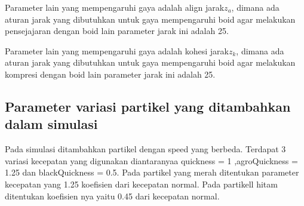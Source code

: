 Parameter lain yang mempengaruhi gaya adalah align jarak$z_a$, dimana ada aturan jarak yang dibutuhkan untuk gaya mempengaruhi boid agar melakukan pensejajaran dengan boid lain parameter jarak ini adalah 25.

Parameter lain yang mempengaruhi gaya adalah kohesi jarak$z_k$, dimana ada aturan jarak yang dibutuhkan untuk gaya mempengaruhi boid agar melakukan kompresi dengan boid lain parameter jarak ini adalah 25.
\subsection{Parameter variasi partikel yang ditambahkan dalam simulasi}
Pada simulasi ditambahkan partikel dengan speed yang berbeda. Terdapat 3 variasi kecepatan yang digunakan diantaranyaa quickness = 1 ,agroQuickness = 1.25 dan blackQuickness = 0.5. Pada partikel yang merah ditentukan parameter kecepatan yang 1.25 koefisien dari kecepatan normal. Pada partikell hitam ditentukan koefisien nya yaitu 0.45 dari kecepatan normal.




%